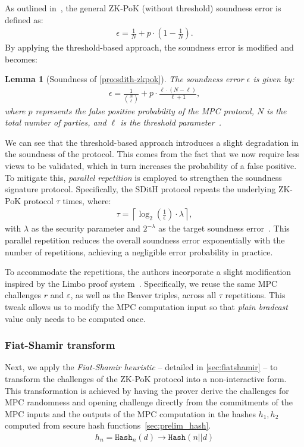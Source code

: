 \documentclass[11pt]{report}
\theoremstyle{definition}
\theoremstyle{plain}
\newtheorem{lemma}{Lemma}[section]
\begin{document}
As outlined in~\cite{feneuil2023threshold}, the general ZK-PoK (without threshold) soundness error is defined as:
\begin{align*}
  \epsilon = \frac{1}{N} + p \cdot \left(1 - \frac{1}{N}\right).
\end{align*}
By applying the threshold-based approach, the soundness error is modified and becomes:
\begin{lemma}[Soundness of \autoref{pro:sdith-zkpok}]
  The soundness error $\epsilon$ is given by:
  \begin{align*}
    \epsilon = \frac{1}{\binom{N}{\ell}} + p \cdot \frac{\ell \cdot (N - \ell)}{\ell + 1},
  \end{align*}
  where $p$ represents the false positive probability of the MPC protocol, $N$ is the total number of parties, and $\ell$ is the threshold parameter~\cite{feneuil2023threshold}.
\end{lemma}
We can see that the threshold-based approach introduces a slight degradation in the soundness of the protocol. This comes from the fact that we now require less views to be validated, which in turn increases the probability of a false positive.
To mitigate this, \textit{parallel repetition} is employed to strengthen the soundness signature protocol. Specifically, the SDitH protocol repeats the underlying ZK-PoK protocol $\tau$ times, where:
\begin{align*}
  \tau = \left\lceil \log_2\left(\frac{1}{\epsilon}\right) \cdot \lambda \right\rceil,
\end{align*}
with $\lambda$ as the security parameter and $2^{-\lambda}$ as the target soundness error~\cite{aguilarsyndrome11}. This parallel repetition reduces the overall soundness error exponentially with the number of repetitions, achieving a negligible error probability in practice.

To accommodate the repetitions, the authors incorporate a slight modification inspired by the Limbo proof system~\cite{delpech2021limbo}. Specifically, we reuse the same MPC challenges $r$ and $\varepsilon$, as well as the Beaver triples, across all $\tau$ repetitions. This tweak allows us to modify the MPC computation input so that \textit{plain bradcast} value only needs to be computed once.

\subsubsection{Fiat-Shamir transform}
Next, we apply the \textit{Fiat-Shamir heuristic} -- detailed in \autoref{sec:fiatshamir} -- to transform the challenges of the ZK-PoK protocol into a non-interactive form. This transformation is achieved by having the prover derive the challenges for MPC randomness and opening challenge directly from the commitments of the MPC inputs and the outputs of the MPC computation in the hashes $h_1, h_2$ computed from secure hash functions~\autoref{sec:prelim_hash}.
\begin{align}
  h_n = \texttt{Hash}_n(d) \rightarrow \texttt{Hash}(n || d)\label{eq:fiatshamirhash}
\end{align}
\end{document}

